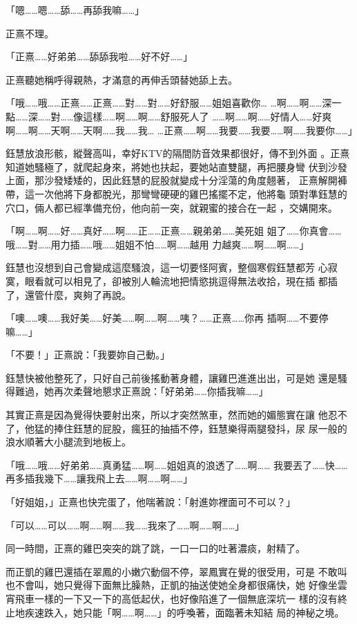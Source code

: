 「嗯……嗯……舔……再舔我嘛……」

正熹不理。

「正熹……好弟弟……舔舔我啦……好不好……」

正熹聽她稱呼得親熱，才滿意的再伸舌頭替她舔上去。

「哦……哦……正熹……正熹……對……對……好舒服……姐姐喜歡你…
…啊……啊……深一點……深……對……像這樣……啊……啊……舒服死人了
……啊……啊……好情人……好爽啊……啊……天啊……天啊……我……我…
…正熹……啊……我要……我要……啊……我要你……」

鈺慧放浪形骸，縱聲高叫，幸好KTV的隔間防音效果都很好，傳不到外面
。正熹知道她騷極了，就爬起身來，將她也扶起，要她站直雙腿，再把腰身彎
伏到沙發上面，那沙發矮矮的，因此鈺慧的屁股就變成十分淫蕩的角度翹著，
正熹解開褲帶，這一次他將下身都脫光，那彎彎硬硬的雞巴搖擺不定，他將龜
頭對準鈺慧的穴口，倆人都已經準備充份，他向前一突，就親蜜的接合在一起
，交媾開來。

「啊……啊……好……真好……啊……正……正熹……親弟弟……美死姐
姐了……你真會……哦……對……用力插……哦……姐姐不怕……啊……越用
力越爽……啊……啊……」

鈺慧也沒想到自己會變成這麼騷浪，這一切要怪阿賓，整個寒假鈺慧都芳
心寂寞，眼看就可以相見了，卻被別人輪流地把情慾挑逗得無法收拾，現在插
都插了，還管什麼，爽夠了再說。

「噢……噢……我好美……好美……啊……啊……咦？……正熹……你再
插啊……不要停嘛……」

「不要！」正熹說：「我要妳自己動。」

鈺慧快被他整死了，只好自己前後搖動著身體，讓雞巴進進出出，可是她
還是騷得難過，她再次柔聲地懇求正熹說：「好弟弟……你插我嘛……」

其實正熹是因為覺得快要射出來，所以才突然煞車，然而她的媚態實在讓
他忍不了，他猛的捧住鈺慧的屁股，瘋狂的抽插不停，鈺慧樂得兩腿發抖，尿
尿一般的浪水順著大小腿流到地板上。

「哦……哦……好弟弟……真勇猛……啊……姐姐真的浪透了……啊……
我要丟了……快……再多插我幾下……讓我飛上去……啊……啊……」

「好姐姐，」正熹也快完蛋了，他喘著說：「射進妳裡面可不可以？」

「可以……可以……啊……啊……我……我來了……啊……啊……」

同一時間，正熹的雞巴突突的跳了跳，一口一口的吐著濃痰，射精了。

而正凱的雞巴還插在翠鳳的小嫩穴動個不停，翠鳳實在覺的很受用，可是
不敢叫也不會叫，她只覺得下面無比臊熱，正凱的抽送使她全身都很痛快，她
好像坐雲宵飛車一樣的一下又一下的高低起伏，也好像陷進了一個無底深坑一
樣的沒有終止地疾速跌入，她只能「啊……啊……」的呼喚著，面臨著未知結
局的神秘之境。

